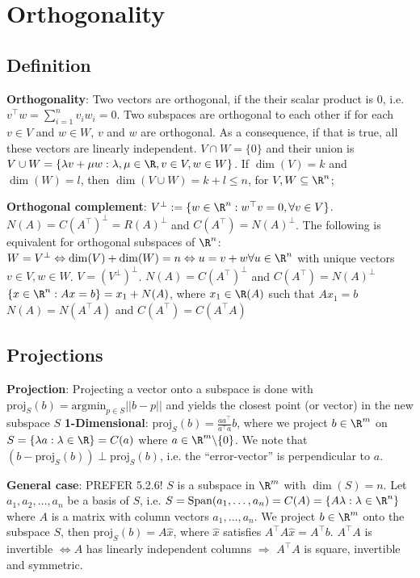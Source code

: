 \newsection
\setcounter{numberSubsections}{1}
\section{Orthogonality}
\subsection{Definition}
\shortdef \textbf{Orthogonality}: Two vectors are orthogonal, if the their scalar product is $0$, i.e. $v^{\top}w = \sum_{i = 1}^{n} v_i w_i = 0$. 
\shortlemma Two subspaces are orthogonal to each other if for each $v \in V$ and $w \in W$, $v$ and $w$ are orthogonal. 
\shortlemma As a consequence, if that is true, all these vectors are linearly independent. 
\shortcorollary $V \cap W = \{0\}$ and their union is $V \cup W = \{\lambda v + \mu w : \lambda, \mu \in \R, v \in V, w \in W\}$. 
If $\dim(V) = k$ and $\dim(W) = l$, then $\dim(V\cup W) = k + l \leq n$, for $V, W \subseteq \R^n$;

\shortdef \textbf{Orthogonal complement}: $V^{\bot} := \{w \in \R^n : w^{\top}v = 0, \forall v \in V\}$. 
\shorttheorem $N(A) = C(A^{\top})^{\bot} = R(A)^{\bot}$ and $C(A^{\top}) = N(A)^{\bot}$.
\shorttheorem The following is equivalent for orthogonal subspaces of $\R^n$: $W = V^{\bot} \Leftrightarrow \dim(V) + \dim(W) = n \Leftrightarrow u = v + w \forall u \in \R^n$ with unique vectors $v \in V, w \in W$. \shortlemma $V = (V^{\bot})^{\bot}$.
\shortcorollary $N(A) = C(A^{\top})^{\bot}$ and $C(A^{\top}) = N(A)^{\bot}$
\shorttheorem $\{x \in \R^n : Ax = b\} = x_1 + N(A)$, where $x_1 \in \R(A)$ such that $Ax_1 = b$
\shortcorollary $N(A) = N(A^{\top}A)$ and $C(A^{\top}) = C(A^{\top}A)$

\newsectionNoPB
\subsection{Projections}
\shortdef \textbf{Projection}:
Projecting a vector onto a subspace is done with $\displaystyle \text{proj}_S(b) = \text{argmin}_{p\in S} ||b - p||$ and yields the closest point (or vector) in the new subspace $S$
\shortlemma \textbf{1-Dimensional}: $\displaystyle \text{proj}_S(b) = \frac{aa^{\top}}{a^{\top}a}b$, where we project $b \in \R^m$ on $S = \{\lambda a : \lambda \in \R\} = C(a)$ where $a \in \R^m\backslash\{0\}$.
We note that $(b - \text{proj}_S(b)) \perp \text{proj}_S(b)$, i.e. the ``error-vector'' is perpendicular to $a$.

\shortlemma \textbf{General case}: PREFER 5.2.6! $S$ is a subspace in $\R^m$ with $\dim(S) = n$.
Let $a_1, a_2, \ldots, a_n$ be a basis of $S$, i.e. $S = \text{Span}(a_1, \ldots, a_n) = C(A) = \{A\lambda : \lambda \in \R^n\}$ where $A$ is a matrix with column vectors $a_1, \ldots, a_n$.
We project $b \in \R^m$ onto the subspace $S$, then $\text{proj}_S(b) = A\hat{x}$, where $\hat{x}$ satisfies $A^{\top}A\hat{x} = A^{\top}b$.
\shortlemma $A^{\top}A$ is invertible $\Leftrightarrow A$ has linearly independent columns $\Rightarrow$ \shortcorollary $A^{\top}A$ is square, invertible and symmetric.

